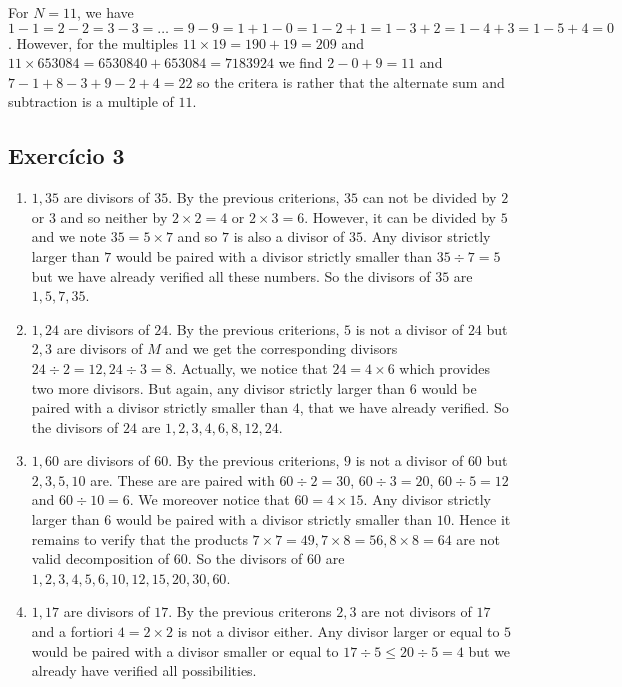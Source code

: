 For $N=11$, we have $1-1=2-2=3-3=\ldots=9-9=1+1-0=1-2+1=1-3+2=1-4+3=1-5+4=0$.
However, for the multiples $11\times19 = 190 + 19 =209$ and
$11 \times 653084 = 6530840 + 653084 = 7183924$ we
find $2-0+9=11$ and $7-1+8-3+9-2+4=22$ so the critera is rather that the
alternate sum and subtraction is a multiple of $11$.

\subsection*{Exercício 3}

\begin{enumerate}
\item $1,35$ are divisors of $35$. By the previous criterions,
  $35$ can not be divided by $2$ or $3$ and so neither by
  $2\times2=4$ or $2\times3=6$.
  However, it can be divided by $5$ and we note $35=5\times7$ and so
  $7$ is also a divisor of $35$. Any divisor strictly larger than $7$ would be
  paired with a divisor strictly smaller
  than $35 \div 7=5$ but we have already verified all these
  numbers. So the divisors of $35$ are $1,5,7,35$.
\item $1,24$ are divisors of $24$.
  By the previous criterions, $5$ is not a divisor
  of $24$ but $2,3$ are divisors of $M$ and we get the corresponding divisors
  $24\div2=12,24\div3=8$. Actually, we notice that $24=4\times6$ which provides
  two more divisors. But again, any divisor strictly larger
  than $6$ would be paired
  with a divisor strictly
  smaller than $4$, that we have already verified. So the
  divisors of $24$ are $1,2,3,4,6,8,12,24$.
\item $1,60$ are divisors of $60$. By the previous criterions, $9$ is not
  a divisor of $60$ but $2,3,5,10$ are. These are are paired with
  $60\div2=30$, $60\div3=20$, $60\div5=12$ and $60\div10=6$. We moreover
  notice that $60=4\times15$. Any divisor strictly larger than $6$ would be
  paired with a divisor strictly smaller than $10$. Hence it remains to
  verify that the products $7\times7=49, 7\times8=56, 8\times8=64$ are not
  valid decomposition of $60$. So the divisors of $60$ are
  $1,2,3,4,5,6,10,12,15,20,30,60$.
\item $1,17$ are divisors of $17$. By the previous criterons $2,3$ are not
  divisors of $17$ and a fortiori $4=2\times2$ is not a divisor either.
  Any divisor larger or equal to $5$ would be paired with a divisor
  smaller or equal to $17 \div 5 \leq 20 \div 5 = 4$ but we already have
  verified all possibilities.

\end{enumerate}

